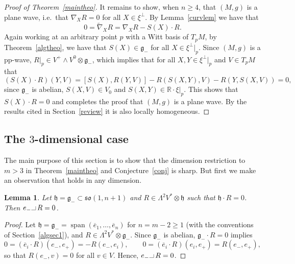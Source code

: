 \documentclass[11pt,a4paper]{amsart}
\DeclareMathOperator{\Span}{span}
\newcommand{\tnab}{\widetilde{\nabla}}
\newcommand{\g}{\mathfrak{g}}
\newcommand{\h}{\mathfrak{h}}
\newcommand{\+}{\oplus}
\newcommand{\so}{\mathfrak{so}}
\newcommand{\hook}{\makebox[7pt]{\rule{6pt}{.3pt}\rule{.3pt}{5pt}}\,}
\newcommand{\1}{\mathbf{1}}
\newcommand{\R}{\mathbb{R}} %
\newcommand{\<}{\langle}
\renewcommand{\>}{\rangle}
\theoremstyle{definition}
\theoremstyle{plain}
\newtheorem{lemma}[definition]{Lemma}
\numberwithin{equation}{section}
\begin{document}
\begin{proof}[Proof of Theorem~\ref{maintheo}]
 It remains to show, when $n\ge 4$, that $(M,g)$ is a plane wave, i.e.~that $\nabla_XR=0$ for all $X\in \xi^\perp$. By Lemma~\ref{curvlem} we have that 
 \[0=\tnab_X R=\nabla_X R -S(X)\cdot R.\]
Again working at an arbitrary point $p$ with a Witt basis of $T_pM$, by Theorem~\ref{algtheo}, we have that $S(X)\in \g_-$ for all $X\in \xi^\perp|_p$. Since $(M,g)$ is a pp-wave,  $R|_p\in V^+\wedge V^0 \otimes \g_-$, which implies that for all $X,Y\in \xi^\perp|_p $ and $V\in T_pM$ that
\[(S(X)\cdot R)(Y,V)=[S(X),R(Y,V)]-R(S(X,Y),V)- R(Y,S(X,V))=0,\]
since $\g_-$ is abelian, $S(X,V)\in V_0$ and $S(X,Y)\in \R\cdot \xi|_p$. This shows that $S(X)\cdot R=0$ and completes the proof that $(M,g)$ is a plane wave. By the results cited in Section~\ref{review} it is also locally homogeneous.
\end{proof}

\subsection{The $3$-dimensional case}\label{dim3sec}
The main purpose of this section is to show that the dimension restriction to $m>3$ in 
Theorem~\ref{maintheo} and Conjecture~\ref{conj} is sharp. But first we make an observation that holds in any dimension.
\begin{lemma}\label{hg-lemma}
Let $\h=\g_-\subset \so(1,n+1)$ and $R\in \Lambda^2 V^*\otimes \h$ such that $\h\cdot R=0$. Then $e_-\hook R=0$.
\end{lemma}
\begin{proof}
Let $\h=\g_-=\Span( \overline{e}_1, \ldots, \overline{e}_n)$ for $n=m-2\ge 1$ (with the conventions of Section~\ref{algsec1}), and $R\in \Lambda^2V^*\otimes \g_-$. Since $\g_-$ is abelian, $\g_-\cdot R=0$ implies
\[ 0=(\overline{e}_i\cdot R) (e_-,e_+)=-R(e_-,e_i),\qquad   0=(\overline{e}_i\cdot R)(e_i,e_+)=R(e_-,e_+),\]
so that $R(e_-,v)=0$ for all $v\in V$. Hence, $e_-\hook R=0$.
\end{proof}
\end{document}
